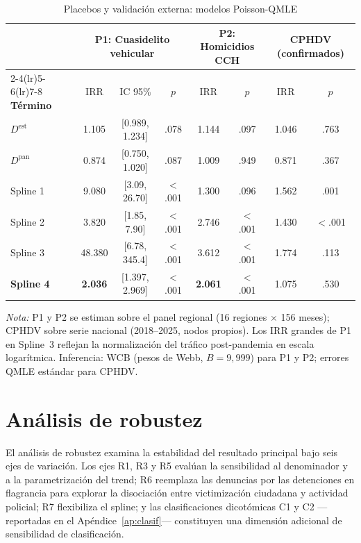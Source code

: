 \documentclass[12pt,a4paper]{article}
\newcommand{\tablenote}[1]{%
  \vspace{2pt}%
  \begin{minipage}{\linewidth}%
    \footnotesize\textit{Nota:} #1%
  \end{minipage}%
}
\begin{document}
\begin{table}[H]
\centering
\caption{Placebos y validaci\'on externa: modelos Poisson-QMLE}
\label{tab:placebos}
\footnotesize
\begin{tabular}{lccc@{\hskip 4mm}cc@{\hskip 4mm}cc}
\toprule
 & \multicolumn{3}{c}{\textbf{P1: Cuasidelito vehicular}} & \multicolumn{2}{c}{\textbf{P2: Homicidios CCH}} & \multicolumn{2}{c}{\textbf{CPHDV (confirmados)}} \\
\cmidrule(lr){2-4}\cmidrule(lr){5-6}\cmidrule(lr){7-8}
\textbf{T\'ermino} & IRR & IC 95\% & $p$ & IRR & $p$ & IRR & $p$ \\
\midrule
$D^{\text{est}}$ & 1.105 & [0.989, 1.234] & .078 & 1.144 & .097 & 1.046 & .763 \\
$D^{\text{pan}}$ & 0.874 & [0.750, 1.020] & .087 & 1.009 & .949 & 0.871 & .367 \\
\midrule
Spline 1 &  9.080 & [3.09, 26.70] & $<$.001 & 1.300 & .096 & 1.562 & .001 \\
Spline 2 &  3.820 & [1.85,  7.90] & $<$.001 & 2.746 & $<$.001 & 1.430 & $<$.001 \\
Spline 3 & 48.380 & [6.78, 345.4] & $<$.001 & 3.612 & $<$.001 & 1.774 & .113 \\
\textbf{Spline 4} & \textbf{2.036} & [1.397, 2.969] & $<$.001 & \textbf{2.061} & $<$.001 & 1.075 & .530 \\
\bottomrule
\end{tabular}
\tablenote{P1 y P2 se estiman sobre el panel regional (16 regiones $\times$ 156 meses);
CPHDV sobre serie nacional (2018--2025, nodos propios). Los IRR grandes de P1 en
Spline~3 reflejan la normalizaci\'on del tr\'afico post-pandemia en escala logar\'itmica.
Inferencia: WCB (pesos de Webb, $B=9{,}999$) para P1 y P2; errores QMLE est\'andar para
CPHDV.}
\end{table}




\section{An\'alisis de robustez}
\label{sec:robustez}

El an\'alisis de robustez examina la estabilidad del resultado principal bajo seis ejes de variaci\'on. Los ejes R1, R3 y R5 eval\'uan la sensibilidad al denominador y a la parametrizaci\'on del trend; R6 reemplaza las denuncias por las detenciones en flagrancia para explorar la disociaci\'on entre victimizaci\'on ciudadana y actividad policial; R7 flexibiliza el spline; y las clasificaciones dicot\'omicas C1 y C2 ---reportadas en el Ap\'endice~\ref{ap:clasif}--- constituyen una dimensi\'on adicional de sensibilidad de clasificaci\'on.
\end{document}
